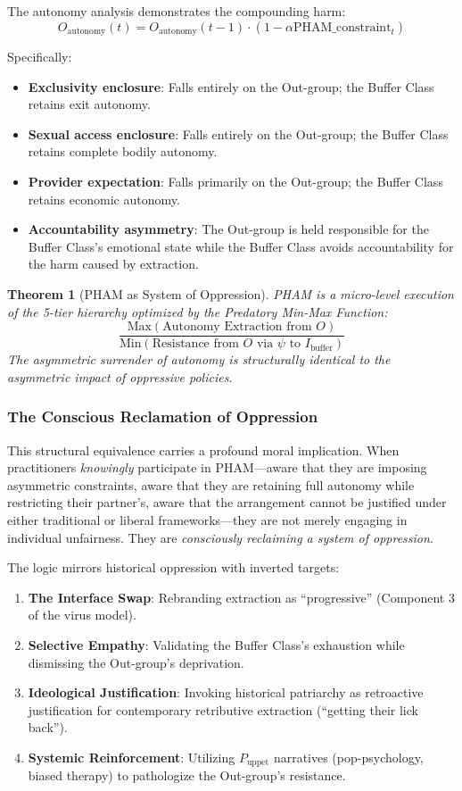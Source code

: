 \documentclass[12pt, letterpaper]{article}
\newtheorem{theorem}{Theorem}[section]
\begin{document}
The autonomy analysis demonstrates the compounding harm:
\[
O_{\text{autonomy}}(t) = O_{\text{autonomy}}(t-1) \cdot (1 - \alpha \text{PHAM\_constraint}_t)
\]

Specifically:
\begin{itemize}
    \item \textbf{Exclusivity enclosure}: Falls entirely on the Out-group; the Buffer Class retains exit autonomy.
    \item \textbf{Sexual access enclosure}: Falls entirely on the Out-group; the Buffer Class retains complete bodily autonomy.
    \item \textbf{Provider expectation}: Falls primarily on the Out-group; the Buffer Class retains economic autonomy.
    \item \textbf{Accountability asymmetry}: The Out-group is held responsible for the Buffer Class's emotional state while the Buffer Class avoids accountability for the harm caused by extraction.
\end{itemize}

\begin{theorem}[PHAM as System of Oppression]
PHAM is a micro-level execution of the 5-tier hierarchy optimized by the Predatory Min-Max Function:
\[
\frac{\text{Max}(\text{Autonomy Extraction from } O)}{\text{Min}(\text{Resistance from } O \text{ via } \psi \text{ to } I_{\text{buffer}})}
\]
The asymmetric surrender of autonomy is structurally identical to the asymmetric impact of oppressive policies.
\end{theorem}

\subsubsection{The Conscious Reclamation of Oppression}

This structural equivalence carries a profound moral implication. When practitioners \textit{knowingly} participate in PHAM---aware that they are imposing asymmetric constraints, aware that they are retaining full autonomy while restricting their partner's, aware that the arrangement cannot be justified under either traditional or liberal frameworks---they are not merely engaging in individual unfairness. They are \textit{consciously reclaiming a system of oppression}.

The logic mirrors historical oppression with inverted targets:
\begin{enumerate}
    \item \textbf{The Interface Swap}: Rebranding extraction as ``progressive'' (Component 3 of the virus model).
    \item \textbf{Selective Empathy}: Validating the Buffer Class's exhaustion while dismissing the Out-group's deprivation.
    \item \textbf{Ideological Justification}: Invoking historical patriarchy as retroactive justification for contemporary retributive extraction (``getting their lick back'').
    \item \textbf{Systemic Reinforcement}: Utilizing $P_{\text{uppet}}$ narratives (pop-psychology, biased therapy) to pathologize the Out-group's resistance.
\end{enumerate}
\end{document}

